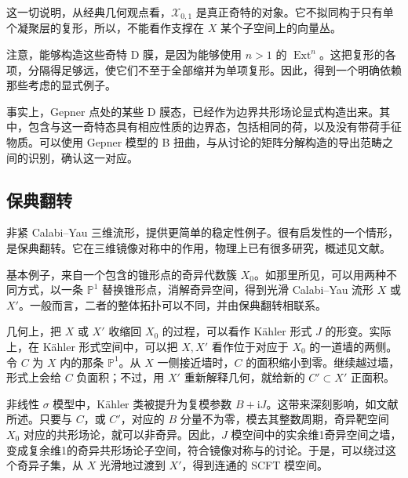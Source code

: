 这一切说明，从经典几何观点看，$\mathcal{X}_{0,1}$ 是真正奇特的对象。它不拟同构于只有单个凝聚层的复形，所以，不能看作支撑在 $X$ 某个子空间上的向量丛。

注意，能够构造这些奇特 D 膜，是因为能够使用 $n>1$ 的 $\operatorname{Ext}^n$。这把复形的各项，分隔得足够远，使它们不至于全部缩并为单项复形。因此，得到一个明确依赖那些考虑的显式例子。

事实上，Gepner 点处的某些 D 膜态，已经作为边界共形场论显式构造出来。其中，包含与这一奇特态具有相应性质的边界态，包括相同的荷，以及没有带荷手征物质。可以使用 Gepner 模型的 B 扭曲，与从讨论的矩阵分解构造的导出范畴之间的识别，确认这一对应。

\subsection{保典翻转}\label{sec:5.5.7}

非紧 Calabi--Yau 三维流形，提供更简单的稳定性例子。很有启发性的一个情形，是保典翻转。它在三维镜像对称中的作用，物理上已有很多研究，概述见文献。

基本例子，来自一个包含的锥形点的奇异代数簇 $X_0$。如那里所见，可以用两种不同方式，以一条 $\mathbb{P}^1$ 替换锥形点，消解奇异空间，得到光滑 Calabi--Yau 流形 $X$ 或 $X'$。一般而言，二者的整体拓扑可以不同，并由保典翻转相联系。

几何上，把 $X$ 或 $X'$ 收缩回 $X_0$ 的过程，可以看作 K\"ahler 形式 $J$ 的形变。实际上，在 K\"ahler 形式空间中，可以把 $X,X'$ 看作位于对应于 $X_0$ 的一道墙的两侧。令 $C$ 为 $X$ 内的那条 $\mathbb{P}^1$。从 $X$ 一侧接近墙时，$C$ 的面积缩小到零。继续越过墙，形式上会给 $C$ 负面积；不过，用 $X'$ 重新解释几何，就给新的 $C'\subset X'$ 正面积。

非线性 $\sigma$ 模型中，K\"ahler 类被提升为复模参数 $B+\mathrm{i}J$。这带来深刻影响，如文献所述。只要与 $C$，或 $C'$，对应的 $B$ 分量不为零，模去其整数周期，奇异靶空间 $X_0$ 对应的共形场论，就可以非奇异。因此，$J$ 模空间中的实余维1奇异空间之墙，变成复余维1的奇异共形场论子空间，符合镜像对称与的讨论。于是，可以绕过这个奇异子集，从 $X$ 光滑地过渡到 $X'$，得到连通的 SCFT 模空间。

